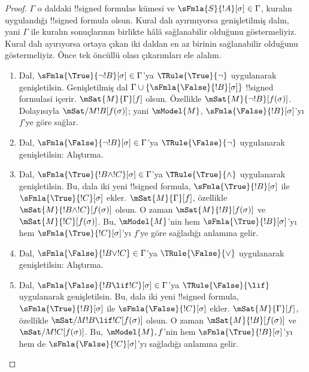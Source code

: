 \documentclass[../../../include/open-logic-section]{subfiles}
\begin{document}
\begin{proof}
$\Gamma$ o daldaki !!{signed formula}s kümesi ve
$\sFmla{S}{!A}[\sigma] \in \Gamma$, kuralın uygulandığı !!{signed formula}
olsun. Kural dalı ayırmıyorsa genişletilmiş dalın, yani $\Gamma$ ile kuralın
sonuçlarının birlikte hâlâ sağlanabilir olduğunu göstermeliyiz. Kural dalı
ayırıyorsa ortaya çıkan iki daldan en az birinin sağlanabilir olduğunu
göstermeliyiz.
Önce tek öncüllü olası çıkarımları ele alalım.
\begin{enumerate}
\item Dal, $\sFmla{\True}{\lnot !B}[\sigma] \in \Gamma$'ya
  $\TRule{\True}{\lnot}$ uygulanarak genişletilsin. Genişletilmiş dal
  $\Gamma \cup \{\sFmla{\False}{!B}[\sigma]\}$ !!{signed formula}s{}i
  içerir. $\mSat{M}{\Gamma}[f]$ olsun. Özellikle
  $\mSat{M}{\lnot !B}[f(\sigma)]$. Dolayısıyla
  $\mSat/{M}{!B}[f(\sigma)]$; yani $\mModel{M}$,
  $\sFmla{\False}{!B}[\sigma]$'yı $f$'ye göre sağlar.
\item Dal, $\sFmla{\False}{\lnot !B}[\sigma] \in \Gamma$'ya
  $\TRule{\False}{\lnot}$ uygulanarak genişletilsin: Alıştırma.
\item Dal, $\sFmla{\True}{!B \land !C}[\sigma] \in \Gamma$'ya
  $\TRule{\True}{\land}$ uygulanarak genişletilsin. Bu, dala iki yeni
  !!{signed formula}, $\sFmla{\True}{!B}[\sigma]$ ile
  $\sFmla{\True}{!C}[\sigma]$ ekler. $\mSat{M}{\Gamma}[f]$, özellikle
  $\mSat{M}{!B \land !C}[f(\sigma)]$ olsun. O zaman
  $\mSat{M}{!B}[f(\sigma)]$ ve $\mSat{M}{!C}[f(\sigma)]$. Bu,
  $\mModel{M}$'nin hem $\sFmla{\True}{!B}[\sigma]$'yı hem
  $\sFmla{\True}{!C}[\sigma]$'yı $f$'ye göre sağladığı anlamına gelir.
\item Dal, $\sFmla{\False}{!B \lor !C} \in \Gamma$'ya
  $\TRule{\False}{\lor}$ uygulanarak genişletilsin: Alıştırma.
\item Dal, $\sFmla{\False}{!B \lif !C}[\sigma] \in \Gamma$'ya
  $\TRule{\False}{\lif}$ uygulanarak genişletilsin. Bu, dala iki yeni
  !!{signed formula}, $\sFmla{\True}{!B}[\sigma]$ ile
  $\sFmla{\False}{!C}[\sigma]$ ekler. $\mSat{M}{\Gamma}[f]$, özellikle
  $\mSat/{M}{!B \lif !C}[f(\sigma)]$ olsun. O zaman
  $\mSat{M}{!B}[f(\sigma)]$ ve $\mSat/{M}{!C}[f(\sigma)]$. Bu,
  $\mModel{M},f$'nin hem $\sFmla{\True}{!B}[\sigma]$'yı hem de
  $\sFmla{\False}{!C}[\sigma]$'yı sağladığı anlamına gelir.

\end{enumerate}
\end{proof}
\end{document}

